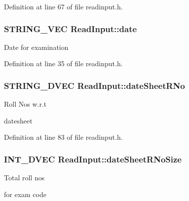 Definition at line 67 of file readinput.\-h.

\hypertarget{classReadInput_a3e8d6a0fef698a51e38fc06be401c390}{
\subsubsection[{date}]{\setlength{\rightskip}{0pt plus 5cm}S\-T\-R\-I\-N\-G\-\_\-\-V\-E\-C Read\-Input\-::date\hspace{0.3cm}{\ttfamily [protected]}}}\label{classReadInput_a3e8d6a0fef698a51e38fc06be401c390}
Date for examination 

Definition at line 35 of file readinput.\-h.

\hypertarget{classReadInput_ab3a09915476fba776592d85dff52187d}{
\subsubsection[{date\-Sheet\-R\-No}]{\setlength{\rightskip}{0pt plus 5cm}S\-T\-R\-I\-N\-G\-\_\-D\-V\-E\-C Read\-Input\-::date\-Sheet\-R\-No\hspace{0.3cm}{\ttfamily [protected]}}}\label{classReadInput_ab3a09915476fba776592d85dff52187d}
\begin{DoxyVerb}                   Roll Nos w.r.t 
\end{DoxyVerb}
 datesheet 

Definition at line 83 of file readinput.\-h.

\hypertarget{classReadInput_aa56be8b352098aff43c904982b3bc2b8}{
\subsubsection[{date\-Sheet\-R\-No\-Size}]{\setlength{\rightskip}{0pt plus 5cm}I\-N\-T\-\_\-D\-V\-E\-C Read\-Input\-::date\-Sheet\-R\-No\-Size\hspace{0.3cm}{\ttfamily [protected]}}}\label{classReadInput_aa56be8b352098aff43c904982b3bc2b8}
\begin{DoxyVerb}                  Total roll nos 
\end{DoxyVerb}
 for exam code 

